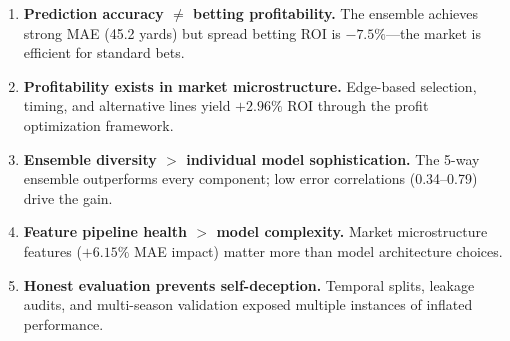 \begin{tcolorbox}[
  colback=accentBlue!3,
  colframe=accentBlue!40,
  title={\small\bfseries Core Findings},
  fonttitle=\bfseries\small,
  boxrule=0.5pt,
  left=6pt, right=6pt, top=4pt, bottom=4pt
]
\small
\begin{enumerate}[itemsep=2pt, parsep=0pt, leftmargin=*]
  \item \textbf{Prediction accuracy $\neq$ betting profitability.} The ensemble achieves strong MAE (45.2 yards) but spread betting ROI is $-7.5\%$---the market is efficient for standard bets.
  \item \textbf{Profitability exists in market microstructure.} Edge-based selection, timing, and alternative lines yield $+2.96\%$ ROI through the profit optimization framework.
  \item \textbf{Ensemble diversity $>$ individual model sophistication.} The 5-way ensemble outperforms every component; low error correlations (0.34--0.79) drive the gain.
  \item \textbf{Feature pipeline health $>$ model complexity.} Market microstructure features ($+6.15\%$ MAE impact) matter more than model architecture choices.
  \item \textbf{Honest evaluation prevents self-deception.} Temporal splits, leakage audits, and multi-season validation exposed multiple instances of inflated performance.
\end{enumerate}
\end{tcolorbox}

\vspace{0.5cm}

